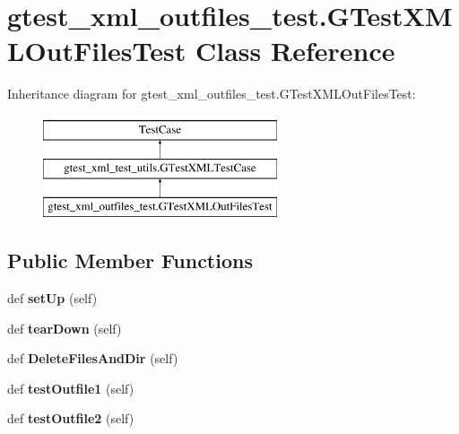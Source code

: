 \hypertarget{classgtest__xml__outfiles__test_1_1_g_test_x_m_l_out_files_test}{}\section{gtest\+\_\+xml\+\_\+outfiles\+\_\+test.\+G\+Test\+X\+M\+L\+Out\+Files\+Test Class Reference}
\label{classgtest__xml__outfiles__test_1_1_g_test_x_m_l_out_files_test}
Inheritance diagram for gtest\+\_\+xml\+\_\+outfiles\+\_\+test.\+G\+Test\+X\+M\+L\+Out\+Files\+Test\+:\begin{figure}[H]
\begin{center}
\leavevmode
\includegraphics[height=3.000000cm]{classgtest__xml__outfiles__test_1_1_g_test_x_m_l_out_files_test}
\end{center}
\end{figure}
\subsection*{Public Member Functions}
\begin{DoxyCompactItemize}
\item 
\mbox{\label{classgtest__xml__outfiles__test_1_1_g_test_x_m_l_out_files_test_a56550f293277d18c36e868a637fe1153}} 
def {\bfseries set\+Up} (self)
\item 
\mbox{\label{classgtest__xml__outfiles__test_1_1_g_test_x_m_l_out_files_test_a49d1d410370ba8a3cfcc281eaadb5706}} 
def {\bfseries tear\+Down} (self)
\item 
\mbox{\label{classgtest__xml__outfiles__test_1_1_g_test_x_m_l_out_files_test_a503d2fbc9cd782ae57ac4307d2db43e1}} 
def {\bfseries Delete\+Files\+And\+Dir} (self)
\item 
\mbox{\label{classgtest__xml__outfiles__test_1_1_g_test_x_m_l_out_files_test_a034738bbc00ac46d00f183402c561228}} 
def {\bfseries test\+Outfile1} (self)
\item 
\mbox{\label{classgtest__xml__outfiles__test_1_1_g_test_x_m_l_out_files_test_a3c02687f092a482d0d0260c7ed94c618}} 
def {\bfseries test\+Outfile2} (self)
\end{DoxyCompactItemize}
